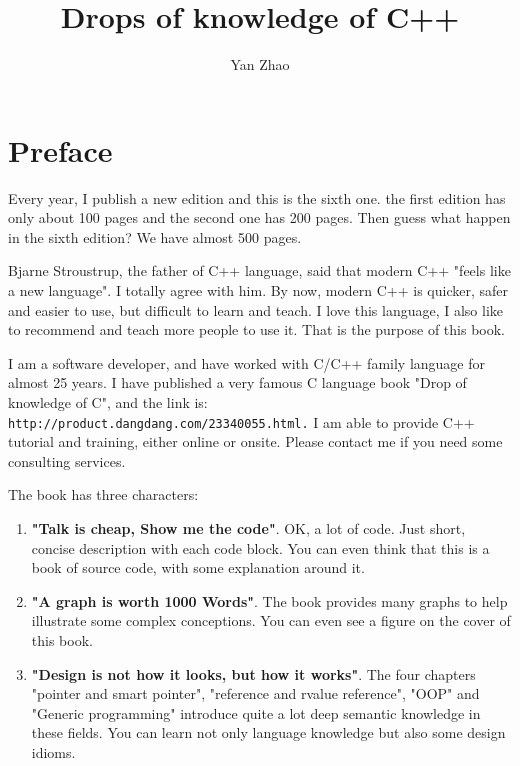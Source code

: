 \documentclass[a4paper,11pt,twoside]{book}
\begin{document}
\title{Drops of knowledge of C++}
\author{Yan Zhao}
\date{}\maketitle

\setcounter{secnumdepth}{4}
\setcounter{tocdepth}{4}
\tableofcontents
\setcounter{page}{1}

\chapter*{Preface}
Every year, I publish a new edition and this is the sixth one. the first edition has only about 100 pages and the second one has 200 pages. Then guess what happen in the sixth edition? We have almost 500 pages.\par \medskip

Bjarne Stroustrup, the father of C++ language, said that modern C++  "feels like a new language". I totally agree with him. By now, modern C++ is quicker, safer and easier to use, but difficult to learn and teach. I love this language, I also like to recommend and teach more people to use it. That is the purpose of this book.  \par \medskip

I am a software developer, and have worked with C/C++ family language for almost 25 years. I have published a very famous C language book "Drop of knowledge of C", and the link is:\\ \verb|http://product.dangdang.com/23340055.html.| I am able to provide C++ tutorial and training, either online or onsite. Please contact me if you need some consulting services.\par \par \medskip

The book has three characters:
\begin{enumerate}
	\item \textbf{"Talk is cheap, Show me the code"}. OK, a lot of code. Just short, concise description with each code block. You can even think that this is a book of source code, with some explanation around it.
	
	\item \textbf{"A graph is worth 1000 Words"}. The book provides many graphs to help illustrate some complex conceptions. You can even see a figure on the cover of this book.
	
	\item \textbf{"Design is not how it looks, but how it works"}. The four chapters "pointer and smart pointer", "reference and rvalue reference", "OOP" and "Generic programming" introduce quite a lot deep semantic knowledge in these fields. You can learn not only language knowledge but also some design idioms.
\end{enumerate}
\end{document}
